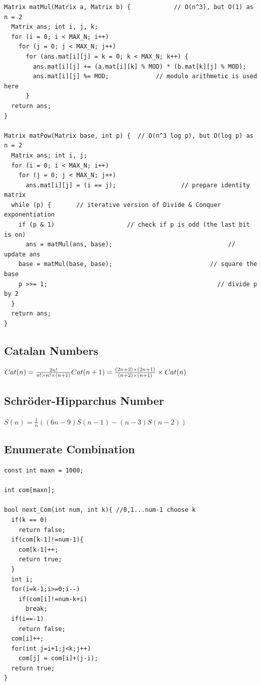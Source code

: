 \documentclass[10pt,landscape]{article}
\begin{document}
\begin{multicols}{2}
\begin{lstlisting}
Matrix matMul(Matrix a, Matrix b) {            // O(n^3), but O(1) as n = 2
  Matrix ans; int i, j, k;
  for (i = 0; i < MAX_N; i++)
    for (j = 0; j < MAX_N; j++)
      for (ans.mat[i][j] = k = 0; k < MAX_N; k++) {
        ans.mat[i][j] += (a.mat[i][k] % MOD) * (b.mat[k][j] % MOD);
        ans.mat[i][j] %= MOD;             // modulo arithmetic is used here
      }
  return ans;
}

Matrix matPow(Matrix base, int p) {  // O(n^3 log p), but O(log p) as n = 2
  Matrix ans; int i, j;
  for (i = 0; i < MAX_N; i++)
    for (j = 0; j < MAX_N; j++)
      ans.mat[i][j] = (i == j);                  // prepare identity matrix
  while (p) {       // iterative version of Divide & Conquer exponentiation
    if (p & 1)                    // check if p is odd (the last bit is on)
      ans = matMul(ans, base);                                // update ans
    base = matMul(base, base);                           // square the base
    p >>= 1;                                               // divide p by 2
  }
  return ans;
}
\end{lstlisting}

\subsection{Catalan Numbers}
\(Cat(n) = \frac{2n!}{n!\times n! \times (n + 1)} \\ 
Cat(n + 1) = \frac{(2n + 2) \times (2n + 1)}{(n + 2) \times (n + 1)}
\times Cat(n) \)

\subsection{Schr\"oder-Hipparchus Number}
\(S(n) = \frac{1}{n}((6n - 9)S(n - 1) - (n - 3)S(n - 2)) \)

\subsection{Enumerate Combination}
\begin{lstlisting}
const int maxn = 1000;

int com[maxn];

bool next_Com(int num, int k){ //0,1...num-1 choose k
  if(k == 0)
    return false;
  if(com[k-1]!=num-1){
    com[k-1]++;
    return true;
  }
  int i;
  for(i=k-1;i>=0;i--)
    if(com[i]!=num-k+i)
      break;
  if(i==-1)
    return false;
  com[i]++;
  for(int j=i+1;j<k;j++)
    com[j] = com[i]+(j-i);
  return true;
}


\end{lstlisting}
\end{multicols}
\end{document}
